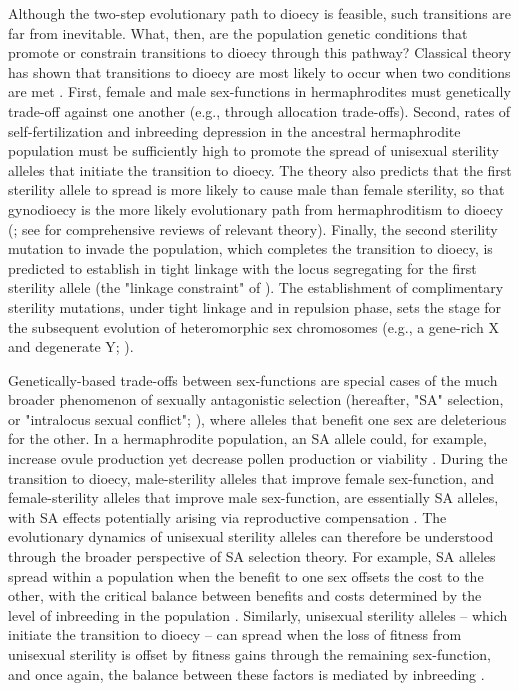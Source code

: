 \documentclass{article}
\begin{document}
Although the two-step evolutionary path to dioecy is feasible, such transitions are far from inevitable. What, then, are the population genetic conditions that promote or constrain transitions to dioecy through this pathway? Classical theory has shown that transitions to dioecy are most likely to occur when two conditions are met \citep{Lewis1941, Lloyd1975, Lloyd1976, Charlesworth1978a}. First, female and male sex-functions in hermaphrodites must genetically trade-off against one another (e.g., through allocation trade-offs). Second, rates of self-fertilization and inbreeding depression in the ancestral hermaphrodite population must be sufficiently high to promote the spread of unisexual sterility alleles that initiate the transition to dioecy. The theory also predicts that the first sterility allele to spread is more likely to cause male than female sterility, so that gynodioecy is the more likely evolutionary path from hermaphroditism to dioecy (\citealt{Lloyd1975, Charlesworth1978a, KaferPannell2017}; see \citealt{Charlesworth1999, Charlesworth2006} for comprehensive reviews of relevant theory). Finally, the second sterility mutation to invade the population, which completes the transition to dioecy, is predicted to establish in tight linkage with the locus segregating for the first sterility allele (the "linkage constraint" of \citealt{Charlesworth1978a}). The establishment of complimentary sterility mutations, under tight linkage and in repulsion phase, sets the stage for the subsequent evolution of heteromorphic sex chromosomes (e.g., a gene-rich X and degenerate Y; \citealt{Rice1987, Bachtrog2006, Charlesworth2002, Qiuetal2013}). 

Genetically-based trade-offs between sex-functions are special cases of the much broader phenomenon of sexually antagonistic selection (hereafter, "SA" selection, or "intralocus sexual conflict"; \citealt{Rice1992,BondurianskyChenoweth2009, Mank2017}), where alleles that benefit one sex are deleterious for the other. In a hermaphrodite population, an SA allele could, for example, increase ovule production yet decrease pollen production or viability \citep{JordanConnallon2014, Olito2016}. During the transition to dioecy, male-sterility alleles that improve female sex-function, and female-sterility alleles that improve male sex-function, are essentially SA alleles, with SA effects potentially arising via reproductive compensation \citep{Lewis1941, Lloyd1975, Charlesworth1978a}. The evolutionary dynamics of unisexual sterility alleles can therefore be understood through the broader perspective of SA selection theory. For example, SA alleles spread within a population when the benefit to one sex offsets the cost to the other, with the critical balance between benefits and costs determined by the level of inbreeding in the population \citep{Kidwell1977, JordanConnallon2014}. Similarly, unisexual sterility alleles -- which initiate the transition to dioecy -- can spread when the loss of fitness from unisexual sterility is offset by fitness gains through the remaining sex-function, and once again, the balance between these factors is mediated by inbreeding \citep{Charlesworth1978a}. 
\end{document}
